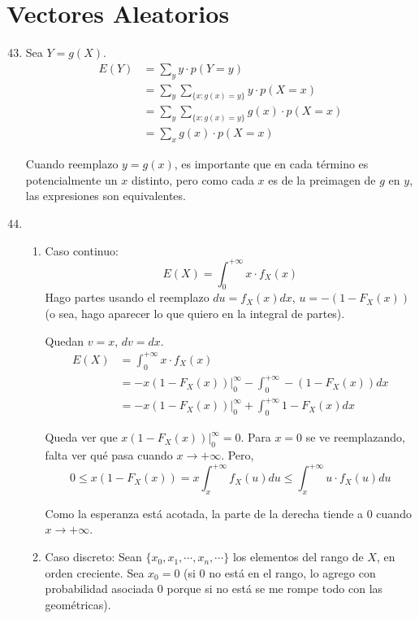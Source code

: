 \section{Vectores Aleatorios}
\begin{enumerate}
	\setcounter{enumi}{42}
	\item
		Sea $Y = g(X)$.
		\begin{align*}
			E(Y)	& = \sum_{y} y\cdot p(Y=y)								\\
					& = \sum_{y} \sum_{\{x : g(x) = y\}} y\cdot p(X=x)		\\
					& = \sum_{y} \sum_{\{x : g(x) = y\}} g(x)\cdot p(X=x)	\\
					& = \sum_{x} g(x)\cdot p(X=x)
		\end{align*}
		
		Cuando reemplazo $y=g(x)$, es importante que en cada término es potencialmente un $x$ distinto,
		pero como cada $x$ es de la preimagen de $g$ en $y$, las expresiones son equivalentes.
		
	\item
		\begin{enumerate}
			\item Caso continuo:
				$$E(X) = \int_0^{+\infty} x\cdot f_X(x)$$
				Hago partes usando el reemplazo $du = f_X(x)dx$, $u = -(1 - F_X(x))$ (o sea, hago aparecer lo que quiero en la integral de partes).
				
				Quedan $v = x$, $dv = dx$.
				\begin{align*}
					E(X)	& = \int_0^{+\infty} x\cdot f_X(x)	\\
							& = -x(1-F_X(x))\Big|_0^\infty - \int_0^{+\infty} -(1 - F_X(x))dx	\\
							& = -x(1-F_X(x))\Big|_0^\infty + \int_0^{+\infty} 1 - F_X(x)dx
				\end{align*}
				
				Queda ver que $x(1-F_X(x))\big|_0^\infty = 0$. Para $x=0$ se ve reemplazando, falta ver qué pasa cuando $x\rightarrow +\infty$.
				Pero,
				$$0 \leq x(1-F_X(x)) = x\int_x^{+\infty}f_X(u)du \leq \int_x^{+\infty}u\cdot f_X(u)du$$
				
				Como la esperanza está acotada, la parte de la derecha tiende a $0$ cuando $x\rightarrow +\infty$.
			\item Caso discreto:
				Sean $\{x_0, x_1, \cdots, x_n, \cdots\}$ los elementos del rango de $X$, en orden creciente. Sea $x_0=0$
				(si $0$ no está en el rango, lo agrego con probabilidad asociada $0$ porque si no está se me rompe todo con las geométricas).
				

\end{enumerate}
\end{enumerate}
